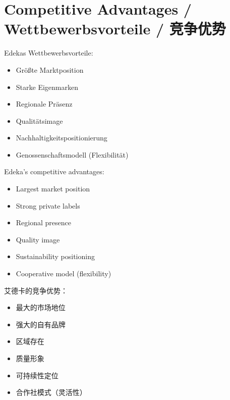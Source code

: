 \section{Competitive Advantages / Wettbewerbsvorteile / 竞争优势}

\begin{otherlanguage}{ngerman}
Edekas Wettbewerbsvorteile:
\begin{itemize}
    \item Größte Marktposition
    \item Starke Eigenmarken
    \item Regionale Präsenz
    \item Qualitätsimage
    \item Nachhaltigkeitspositionierung
    \item Genossenschaftsmodell (Flexibilität)
\end{itemize}
\end{otherlanguage}

Edeka's competitive advantages:
\begin{itemize}
    \item Largest market position
    \item Strong private labels
    \item Regional presence
    \item Quality image
    \item Sustainability positioning
    \item Cooperative model (flexibility)
\end{itemize}

艾德卡的竞争优势：
\begin{itemize}
    \item 最大的市场地位
    \item 强大的自有品牌
    \item 区域存在
    \item 质量形象
    \item 可持续性定位
    \item 合作社模式（灵活性）
\end{itemize}
